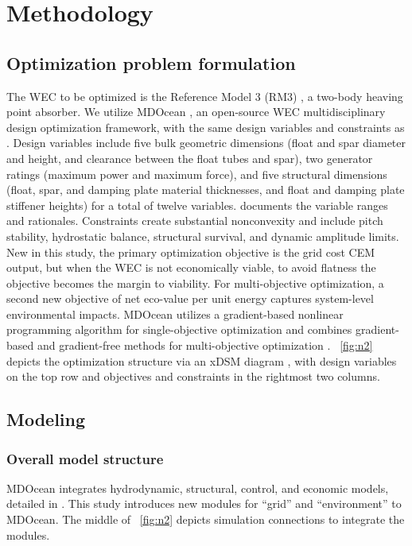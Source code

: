 \documentclass[10pt,twoside]{article}
\begin{document}

\section{Methodology}
\subsection{Optimization problem formulation}
The WEC to be optimized is the Reference Model 3 (RM3) \cite{neary_reference_2014}, a two-body heaving point absorber.
We utilize MDOcean \cite{mccabe_mdocean_2024}, an open-source WEC multidisciplinary design optimization framework, with the same design variables and constraints as \cite{mccabe_leveraging_2025}.
Design variables include five bulk geometric dimensions (float and spar diameter and height, and clearance between the float tubes and spar), two generator ratings (maximum power and maximum force), and five structural dimensions (float, spar, and damping plate material thicknesses, and float and damping plate stiffener heights) for a total of twelve variables.
\cite{mccabe_leveraging_2025} documents the variable ranges and rationales.
Constraints create substantial nonconvexity and include pitch stability, hydrostatic balance, structural survival, and dynamic amplitude limits.
New in this study, the primary optimization objective is the grid cost CEM output, but when the WEC is not economically viable, to avoid flatness the objective becomes the margin to viability.
For multi-objective optimization, a second new objective of net eco-value per unit energy captures system-level environmental impacts.
MDOcean utilizes a gradient-based nonlinear programming algorithm for single-objective optimization and combines gradient-based and gradient-free methods for multi-objective optimization \cite{mccabe_leveraging_2025}.
\figureautorefname~\ref{fig:n2} depicts the optimization structure via an xDSM diagram \cite{lambe_extensions_2012}, with design variables on the top row and objectives and constraints in the rightmost two columns.

\subsection{Modeling}
\subsubsection{Overall model structure}
MDOcean integrates hydrodynamic, structural, control, and economic models, detailed in \cite{mccabe_leveraging_2025}.
This study introduces new modules for ``grid'' and ``environment'' to MDOcean. The middle of \figureautorefname~\ref{fig:n2} depicts simulation connections to integrate the modules.
\end{document}
